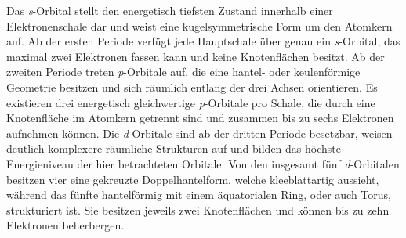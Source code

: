 
Das \textit{s}-Orbital stellt den energetisch tiefsten Zustand innerhalb einer Elektronenschale dar und weist eine kugelsymmetrische Form um den Atomkern auf. Ab der ersten Periode verfügt jede Hauptschale über genau ein \textit{s}-Orbital, das maximal zwei Elektronen fassen kann und keine Knotenflächen besitzt. \cite{skript}\newline \newline
Ab der zweiten Periode treten \textit{p}-Orbitale auf, die eine hantel- oder keulenförmige Geometrie besitzen und sich räumlich entlang der drei Achsen orientieren. Es existieren drei energetisch gleichwertige \textit{p}-Orbitale pro Schale, die durch eine Knotenfläche im Atomkern getrennt sind und zusammen bis zu sechs Elektronen aufnehmen können. \cite{skript} \newline \newline
Die \textit{d}-Orbitale sind ab der dritten Periode besetzbar, weisen deutlich komplexere räumliche Strukturen auf und bilden das höchste Energieniveau der hier betrachteten Orbitale. Von den insgesamt fünf \textit{d}-Orbitalen besitzen vier eine gekreuzte Doppelhantelform, welche kleeblattartig aussieht, während das fünfte hantelförmig mit einem äquatorialen Ring, oder auch Torus, strukturiert ist. Sie besitzen jeweils zwei Knotenflächen und können bis zu zehn Elektronen beherbergen. \cite{skript}

